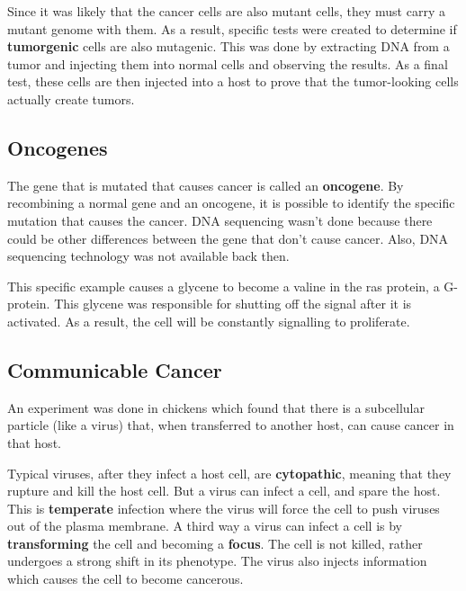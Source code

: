 \documentclass{article}
\begin{document}
Since it was likely that the cancer cells are also mutant cells, they must carry
a mutant genome with them. As a result, specific tests were created to
determine if \textbf{tumorgenic} cells are also mutagenic. This was done by
extracting DNA from a tumor and injecting them into normal cells and observing
the results. As a final test, these cells are then injected into a host to prove
that the tumor-looking cells actually create tumors.

\subsection{Oncogenes}

The gene that is mutated that causes cancer is called an \textbf{oncogene}. By
recombining a normal gene and an oncogene, it is possible to identify the
specific mutation that causes the cancer. DNA sequencing wasn't done because
there could be other differences between the gene that don't cause cancer. Also,
DNA sequencing technology was not available back then.

This specific example causes a glycene to become a valine in the ras protein, a
G-protein. This glycene was responsible for shutting off the signal after it is
activated. As a result, the cell will be constantly signalling to proliferate.

\subsection{Communicable Cancer}

An experiment was done in chickens which found that there is a subcellular
particle (like a virus) that, when transferred to another host, can cause cancer
in that host. 

Typical viruses, after they infect a host cell, are \textbf{cytopathic}, meaning
that they rupture and kill the host cell. But a virus can infect a cell, and
spare the host. This is \textbf{temperate} infection where the virus will force
the cell to push viruses out of the plasma membrane. A third way a virus can
infect a cell is by \textbf{transforming} the cell and becoming a
\textbf{focus}. The cell is not killed, rather undergoes a strong shift in its
phenotype. The virus also injects information which causes the cell to become
cancerous. 
\end{document}
